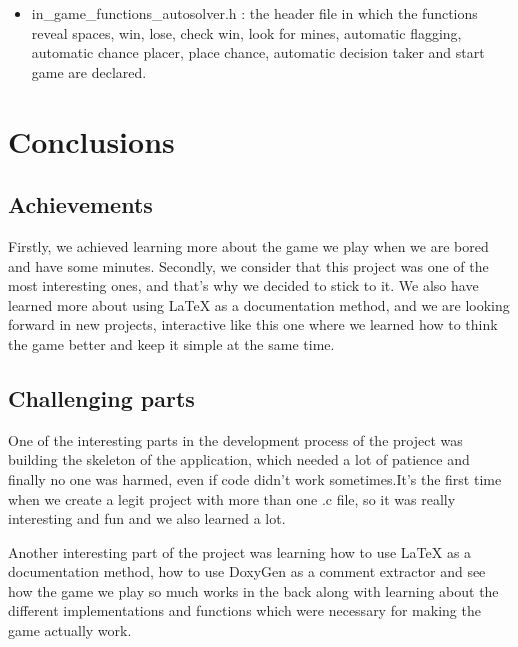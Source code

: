 \documentclass{article}
\begin{document}
\begin{itemize}
\begin{itemize}
 	\item in\_game\_functions\_autosolver.h : the header file in which the functions reveal spaces, win, lose, check win, look for mines, automatic flagging, automatic chance placer, place chance, automatic decision taker and start game are declared.
 	
 \end{itemize}
   
      \end{itemize}
  
 


\section{Conclusions}


\subsection{Achievements}

Firstly, we achieved learning more about the game we play when we are bored and have some minutes. Secondly, we consider that this project was one of the most interesting ones, and that's why we decided to stick to it. We also have learned more about using LaTeX as a documentation method, and we are looking forward in new projects, interactive like this one where we learned how to think the game better and keep it simple at the same time.
\linebreak

\subsection{Challenging parts}

One of the interesting parts in the development process of the project was building the skeleton of the application, which needed a lot of patience and finally no one was harmed, even if code didn't work sometimes.It's the first time when we create a legit project with more than one .c file, so it was really interesting and fun and we also learned a lot.
\newline

Another interesting part of the project was learning how to use LaTeX as a documentation method, how to use DoxyGen as a comment extractor and see how the game we play so much works in the back along with learning about the different implementations and functions which were necessary for making the game actually work.
\newline
\end{document}
